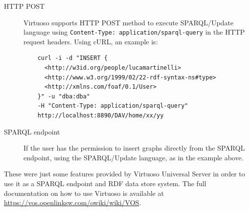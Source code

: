 \begin{description}
  \item[\ac{HTTP} POST] Virtuoso supports \ac{HTTP} POST method to execute \ac{SPARQL}/Update language using \verb#Content-Type: application/sparql-query# in the \ac{HTTP} request headers. Using cURL, an example is:
  \begin{verbatim}
    curl -i -d "INSERT {
      <http://w3id.org/people/lucamartinelli>
      <http://www.w3.org/1999/02/22-rdf-syntax-ns#type>
      <http://xmlns.com/foaf/0.1/User>
    }" -u "dba:dba"
    -H "Content-Type: application/sparql-query"
    http://localhost:8890/DAV/home/xx/yy
  \end{verbatim}

  \item[\ac{SPARQL} endpoint] If the user has the permission to insert graphs directly from the \ac{SPARQL} endpoint, using the \ac{SPARQL}/Update language, as in the example above.
\end{description}

These were just some features provided by Virtuoso Universal Server in order to use it as a \ac{SPARQL} endpoint and \ac{RDF} data store system. The full documentation on how to use Virtuoso is available at \url{https://vos.openlinksw.com/owiki/wiki/VOS}.